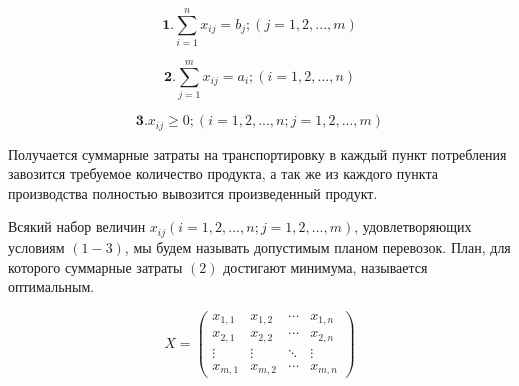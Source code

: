 \documentclass[a4paper,12pt]{article}
\begin{document}
	\[
		\textbf{1.} \sum\limits_{i=1}^n x_{ij} = b_j; (j = 1, 2, ..., m) 
	\]
	
	\[
		\textbf{2.} \sum\limits_{j=1}^m x_{ij} = a_i; (i = 1, 2, ..., n)
	\]
	
	\[
		\textbf{3.} x_{ij} \geqslant 0; (i = 1, 2, ..., n; j = 1, 2, ..., m)
	\]

	Получается суммарные затраты на транспортировку в каждый пункт потребления завозится требуемое количество продукта, а так же из каждого пункта производства полностью вывозится произведенный продукт.
	
	Всякий набор величин $x_{ij} (i = 1, 2, ..., n; j = 1, 2, ..., m)$, удовлетворяющих условиям $(1-3)$, мы будем называть допустимым планом перевозок. План, для которого суммарные затраты $(2)$ достигают минимума, называется оптимальным.
	
	\begin{equation}
		X = 
		\begin{pmatrix}
			x_{1,1} & x_{1,2} & \cdots & x_{1,n} \\
			x_{2,1} & x_{2,2} & \cdots & x_{2,n} \\
			\vdots  & \vdots  & \ddots & \vdots  \\
			x_{m,1} & x_{m,2} & \cdots & x_{m,n} 
		\end{pmatrix}
	\end{equation}
\end{document}

